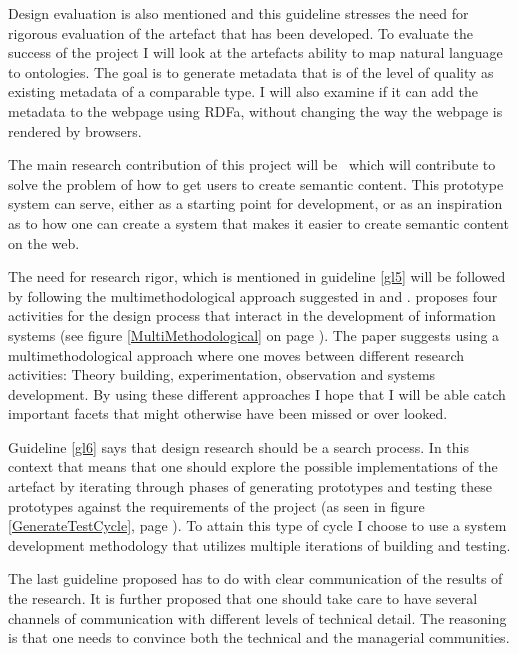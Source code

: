 Design evaluation is also mentioned and this guideline stresses the need for rigorous evaluation of the artefact that has been developed.
To evaluate the success of the project I will look at the artefacts ability to map natural language to ontologies.
The goal is to generate metadata that is of the level of quality as existing metadata of a comparable type.
I will also examine if it can add the metadata to the webpage using RDFa, without changing the way the webpage is rendered by browsers.

The main research contribution of this project will be \theartefact\,
which will contribute to solve the problem of how to get users to create semantic content.
This prototype system can serve, either as a starting point for development,
or as an inspiration as to how one can create a system that makes it easier to create semantic content on the web.

The need for research rigor, which is mentioned in guideline \ref{gl5} will be followed by following the multimethodological approach suggested in \citet{Chen1990} and \citet{NunamakerJr1990}.
\citet{Chen1990} proposes four activities for the design process that interact in the development of information systems
(see figure \ref{MultiMethodological} on page \pageref{MultiMethodological}).
The paper suggests using a multimethodological approach where one moves between different research activities:
Theory building, experimentation, observation and systems development.
By using these different approaches I hope that I will be able catch important facets that might otherwise have been missed or over looked.

Guideline \ref{gl6} says that design research should be a search process.
In this context that means that one should explore the possible implementations of the artefact by iterating through phases of
generating prototypes and testing these prototypes against the requirements of the project (as seen in figure \ref{GenerateTestCycle},
page \pageref{GenerateTestCycle}).
To attain this type of cycle I choose to use a system development methodology that utilizes multiple iterations of building and testing.

The last guideline proposed has to do with clear communication of the results of the research.
It is further proposed that one should take care to have several channels of communication with different levels of technical detail.
The reasoning is that one needs to convince both the technical and the managerial communities.

